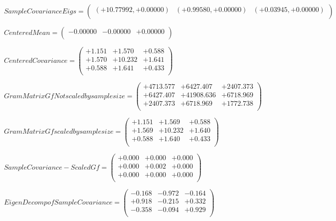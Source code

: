 \documentclass[9pt]{article}
\theoremstyle{plain}
\theoremstyle{definition}
\theoremstyle{remark}
\numberwithin{equation}{section}
\begin{document}
$Sample Covariance Eigs = \left(
\begin{array}{
ccc}
(+10.77992,+0.00000) & (+0.99580,+0.00000) & (+0.03945,+0.00000) \\
\end{array}
\right)$ \newline 

$Centered Mean = \left(
\begin{array}{
ccc}
-0.00000 & -0.00000 & +0.00000 \\
\end{array}
\right)$ \newline 

$Centered Covariance = \left(
\begin{array}{
ccc}
+1.151 & +1.570 & +0.588 \\
+1.570 & +10.232 & +1.641 \\
+0.588 & +1.641 & +0.433 \\
\end{array}
\right)$ \newline 

$Gram Matrix Gf Not scaled by sample size = \left(
\begin{array}{
ccc}
+4713.577 & +6427.407 & +2407.373 \\
+6427.407 & +41908.636 & +6718.969 \\
+2407.373 & +6718.969 & +1772.738 \\
\end{array}
\right)$ \newline 

$Gram Matrix Gf  scaled by sample size = \left(
\begin{array}{
ccc}
+1.151 & +1.569 & +0.588 \\
+1.569 & +10.232 & +1.640 \\
+0.588 & +1.640 & +0.433 \\
\end{array}
\right)$ \newline 

$SampleCovariance - Scaled Gf = \left(
\begin{array}{
ccc}
+0.000 & +0.000 & +0.000 \\
+0.000 & +0.002 & +0.000 \\
+0.000 & +0.000 & +0.000 \\
\end{array}
\right)$ \newline 

$EigenDecomp of SampleCovariance = \left(
\begin{array}{
ccc}
-0.168 & -0.972 & -0.164 \\
+0.918 & -0.215 & +0.332 \\
-0.358 & -0.094 & +0.929 \\
\end{array}
\right)$ \newline 
\end{document}
